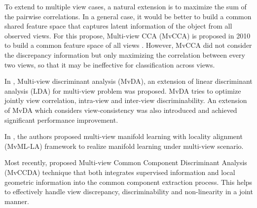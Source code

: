         To extend to multiple view cases, a natural extension is to maximize the sum of the pairwise correlations.
        In a general case, it would be better to build a common shared feature space that captures latent information of the object from all observed views.
        For this propose, Multi-view CCA (MvCCA) is proposed in 2010 to build a common feature space of all views \cite{rupnik2010multi}. 
        However, MvCCA did not consider the discrepancy information but only maximizing the correlation between every two views, so that it may be ineffective for classification across views. 

        In \cite{kan2015multi}, Multi-view discriminant analysis (MvDA), an extension of linear discriminant analysis (LDA) for multi-view problem was proposed.
        MvDA tries to optimize jointly view correlation, intra-view and inter-view discriminability. 
        An extension of MvDA which considers view-consistency was also introduced and achieved significant performance improvement.

        In \cite{zhao2018multi}, the authors proposed multi-view manifold learning with locality alignment (MvML-LA) framework to realize manifold learning under multi-view scenario. 

        Most recently, \cite{you2019multi} proposed Multi-view Common Component Discriminant Analysis (MvCCDA) technique that both integrates supervised information and local geometric information into the common component extraction process.
        This helps to effectively handle view discrepancy, discriminability and non-linearity in a joint manner.
